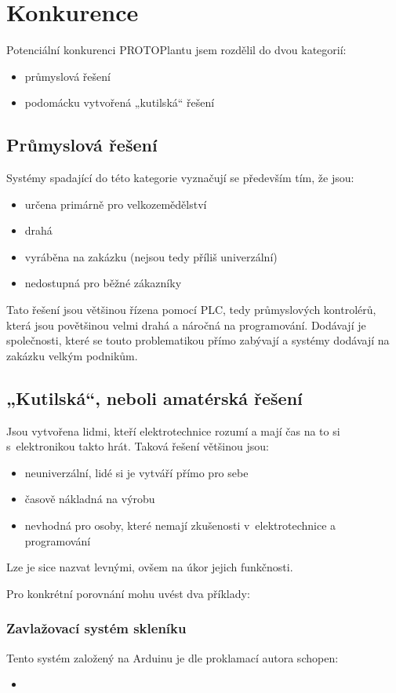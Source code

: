 \chapter{Konkurence}
Potenciální konkurenci PROTOPlantu jsem rozdělil do dvou kategorií:
\begin{itemize}
    \item průmyslová řešení
    \item podomácku vytvořená „kutilská“ řešení
\end{itemize}

\section{Průmyslová řešení}
Systémy spadající do této kategorie vyznačují se především tím, že jsou:
\begin{itemize}
    \item určena primárně pro velkozemědělství
    \item drahá
    \item vyráběna na zakázku (nejsou tedy příliš univerzální)
    \item nedostupná pro běžné zákazníky
\end{itemize}

Tato řešení jsou většinou řízena pomocí PLC, tedy průmyslových kontrolérů, která jsou povětšinou velmi drahá a náročná na programování.
Dodávají je společnosti, které se touto problematikou přímo zabývají a systémy dodávají na zakázku velkým podnikům.

\section{„Kutilská“, neboli amatérská řešení}
Jsou vytvořena lidmi, kteří elektrotechnice rozumí a mají čas na to si s~elektronikou takto hrát.
Taková řešení většinou jsou:
\begin{itemize}
    \item neuniverzální, lidé si je vytváří přímo pro sebe
    \item časově nákladná na výrobu
    \item nevhodná pro osoby, které nemají zkušenosti v~elektrotechnice a programování
\end{itemize}

Lze je sice nazvat levnými, ovšem na úkor jejich funkčnosti.

Pro konkrétní porovnání mohu uvést dva příklady:
\subsection{Zavlažovací systém skleníku \cite{ARDUGREENHOUSE}}
Tento systém založený na Arduinu je dle proklamací autora schopen:
\begin{itemize}
    \item 
\end{itemize}

